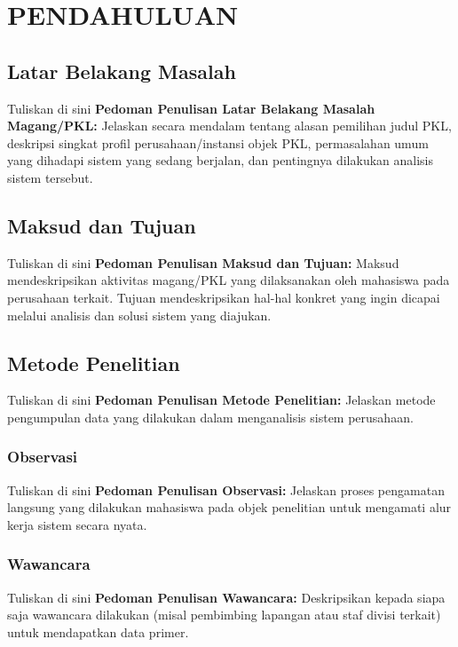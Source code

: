 \chapter{PENDAHULUAN}
\section{Latar Belakang Masalah}


Tuliskan di sini \textbf{Pedoman Penulisan Latar Belakang Masalah Magang/PKL:} Jelaskan secara mendalam tentang alasan pemilihan judul PKL, deskripsi singkat profil perusahaan/instansi objek PKL, permasalahan umum yang dihadapi sistem yang sedang berjalan, dan pentingnya dilakukan analisis sistem tersebut.


\section{Maksud dan Tujuan}


Tuliskan di sini \textbf{Pedoman Penulisan Maksud dan Tujuan:} Maksud mendeskripsikan aktivitas magang/PKL yang dilaksanakan oleh mahasiswa pada perusahaan terkait. Tujuan mendeskripsikan hal-hal konkret yang ingin dicapai melalui analisis dan solusi sistem yang diajukan.


\section{Metode Penelitian}


Tuliskan di sini \textbf{Pedoman Penulisan Metode Penelitian:} Jelaskan metode pengumpulan data yang dilakukan dalam menganalisis sistem perusahaan.


\subsection{Observasi}


Tuliskan di sini \textbf{Pedoman Penulisan Observasi:} Jelaskan proses pengamatan langsung yang dilakukan mahasiswa pada objek penelitian untuk mengamati alur kerja sistem secara nyata.


\subsection{Wawancara}


Tuliskan di sini \textbf{Pedoman Penulisan Wawancara:} Deskripsikan kepada siapa saja wawancara dilakukan (misal pembimbing lapangan atau staf divisi terkait) untuk mendapatkan data primer.


